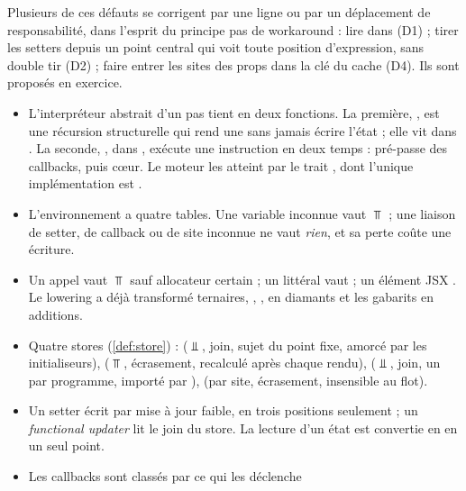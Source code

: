 \begin{remarque}
  Plusieurs de ces défauts se corrigent par une ligne ou par un déplacement
  de responsabilité, dans l'esprit du principe \og pas de workaround\fg{} :
  lire  dans  (D1) ; tirer les
  setters depuis un point central qui voit toute position d'expression,
  sans double tir (D2) ; faire entrer les sites des props dans la clé du
  cache (D4). Ils sont proposés en exercice.
\end{remarque}

\begin{resume}
\begin{itemize}
  \item L'interpréteur abstrait d'un pas tient en deux fonctions. La
    première, , est une récursion structurelle qui
    rend une  sans jamais écrire l'état ; elle vit dans
    . La seconde, , dans
    , exécute une instruction en deux temps :
    pré-passe des callbacks, puis cœur. Le moteur les atteint par le trait
    , dont l'unique implémentation est
    .
  \item L'environnement  a quatre tables. Une variable
    inconnue vaut $\Top$ ; une liaison de setter, de callback ou de site
    inconnue ne vaut \emph{rien}, et sa perte coûte une écriture.
  \item Un appel vaut $\Top$ sauf allocateur certain ; un littéral vaut
     ; un élément JSX . Le lowering a
    déjà transformé ternaires, \code{&&}, \code{||},  en diamants et
    les gabarits en additions.
  \item Quatre stores (\cref{def:store}) :  ($\Bot$, join,
    sujet du point fixe, amorcé par les initialiseurs), 
    ($\Top$, écrasement, recalculé après chaque rendu),
     ($\Bot$, join, un par programme, importé par
    ),  (par site, écrasement, insensible au flot).
  \item Un setter écrit par mise à jour faible, en trois positions
    seulement ; un \emph{functional updater} lit le join du store. La lecture
    d'un état est convertie en  en un seul point.
  \item Les callbacks sont classés par ce qui les déclenche

\end{itemize}
\end{resume}
